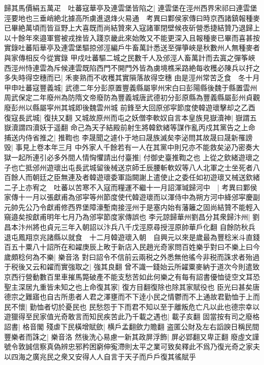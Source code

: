 歸其馬價絹五萬疋　吐蕃寇華亭及連雲堡皆陷之|{
	連雲堡在涇州西界宋祁曰連雲堡涇要地也三垂峭絶北據高所虜進退烽火易通　考異曰鄴侯家傳曰時京西諸鎮報種麥已畢絶萬頃而皆亘野上大喜既而尚結贊來入寇諸軍閉壁候夜斫營悉捷結贊乃退歸上以十餘年來邉軍嘗被戎挫皆入踐京畿此來始敗又不能更深入且報種麥已畢而喜甚按實錄吐蕃䧟華亭及連雲堡驅掠邠涇編戶牛畜萬計悉送至彈箏峽是秋數州人無種麥者與家傳相反今從實錄}
甲戍吐蕃驅二城之民數千人及邠涇人畜萬計而去寘之彈筝峽西涇州恃連雲為斥候連雲既陷西門不開門外皆為虜境樵采路絶每收穫必陳兵以扞之多失時得空穗而已|{
	禾麥熟而不收穫其實隕落故得空穗}
由是涇州常苦乏食　冬十月甲申吐蕃寇豐義城|{
	武德二年分彭原置豐義縣屬寧州宋白曰彭陽縣後魏于縣置雲州周武保定二年廢州為防隋文帝廢防為豐義城唐武德初分彭原縣為豐義縣屬彭州貞觀廢彭州以縣屬寜州其城即後魏雲州城}
前鋒至大回原邠寜節度使韓遊瓌擊却之乙酉復寇長武城|{
	復扶又翻}
又城故原州而屯之妖僧李軟奴自言本皇族見嶽瀆神|{
	嶽謂五嶽瀆謂四瀆妖于遥翻}
命己為天子結殿前射生將韓欽緒等謀作亂丙戍其黨告之上命捕送内侍省推之|{
	推鞫也}
李晟聞之遽仆于地曰晟族滅矣李泌問其故晟曰晟新罹謗毁|{
	事見上卷本年三月}
中外家人千餘若有一人在其黨中則兄亦不能救矣泌乃密奏大獄一起所連引必多外間人情恟懼請出付臺推|{
	付御史臺推鞫之也}
上從之欽緒遊瓌之子也亡抵邠州遊瓌出屯長武城留後械送京師壬辰腰斬軟奴等八人北軍之士坐死者八百餘人而朝廷之臣無連及者韓遊瓌委軍詣闕謝上遣使止之委任如初遊瓌又械送欽緒二子上亦宥之　吐蕃以苦寒不入寇而糧運不繼十一月詔渾瑊歸河中　|{
	考異曰鄴侯家傳十一月以張獻甫為邠寜等州節度使代韓遊瓌而以渾侍中為朔方河中絳邠寜慶副元帥先公乃令獻甫修西界堡障濠塹南接涇州于是塞内始有藩籬之固尚結贊不能輕入窺邉矣按獻甫明年七月乃為邠寜節度家傳誤也}
李元諒歸華州劉昌分其衆歸汴州|{
	劉昌本汴州將也貞元三年入朝詔以汴兵八千戊涇原尋授涇原帥華戶化翻}
自餘防秋兵退屯鳳翔京兆諸縣以就食　十二月韓遊瓌入朝　自興元以來是歲最為豐稔米斗直錢百五十粟八十詔所在和糴庚辰上畋于新店入民趙光奇家問百姓樂乎對曰不樂上曰今歲頗稔何為不樂|{
	樂音洛}
對曰詔令不信前云兩税之外悉無他徭今非税而誅求者殆過于税後又云和糴而實強取之|{
	強其良翻}
曾不識一錢始云所糴粟麥納于道次今則遣致京西行營動數百里車摧馬斃破產不能支愁苦如此何樂之有每有詔書優恤徒空文耳恐聖主深居九重皆未知之也上命復其家|{
	復方目翻復除也除其家賦役也}
臣光曰甚矣唐德宗之難寤也自古所患者人君之澤壅而不下逹小民之情鬱而不上通故君勤恤于上而民不懷|{
	勤恤者切於憂民也}
民愁怨于下而君不知以至于離叛危亡凡以此也德宗幸以遊獵得至民家值光奇敢言而知民疾苦此乃千載之遇也|{
	載子亥翻}
固當按有司之廢格詔書|{
	格音閣}
殘虐下民橫增賦歛|{
	横戶孟翻歛力贍翻}
盗匿公財及左右謟諛日稱民間豐樂者而誅之|{
	樂音洛}
然後洗心易慮一新其政屏浮飾|{
	屏必郢翻又卑正翻}
廢虛文謹號令敦誠信察真偽辨忠邪矜困窮伸寃滯則太平之業可致矣釋此不爲乃復光奇之家夫以四海之廣兆民之衆又安得人人自言于天子而戶戶復其徭賦乎

